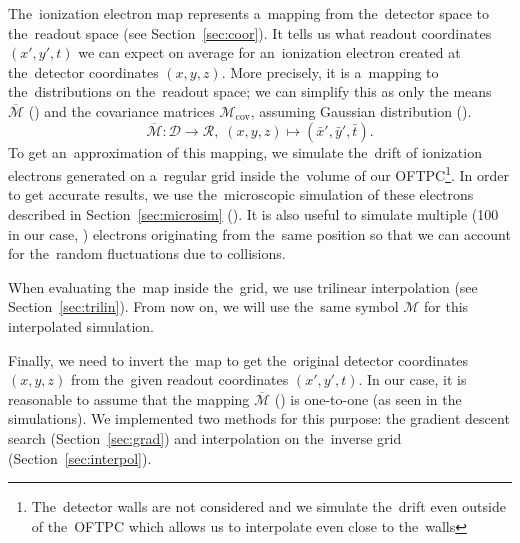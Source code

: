 		The~ionization electron map represents a~mapping from the~detector space to the~readout space (see Section~\ref{sec:coor}). It tells us what readout coordinates $(x',y',t)$ we can expect on average for an~ionization electron created at the~detector coordinates $(x,y,z)$. More precisely, it is a~mapping to the~distributions on the~readout space; we can simplify this as only the means $\overbar{\mathcal{M}}$ () and the covariance matrices $\mathcal{M}_\text{cov}$, assuming Gaussian distribution ().
			\begin{equation}
				\overbar{\mathcal{M}}: \mathcal{D} \longrightarrow \mathcal{R},\; (x,y,z) \longmapsto (\bar{x}',\bar{y}',\bar{t}).
			\end{equation}
		To get an~approximation of this mapping, we simulate the~drift of ionization electrons generated on a~regular grid inside the~volume of our \ac{OFTPC}\footnote{The~detector walls are not considered and we simulate the~drift even outside of the~\ac{OFTPC} which allows us to interpolate even close to the~walls}. In order to get accurate results, we use the~microscopic simulation of these electrons described in Section~\ref{sec:microsim} (). It is also useful to simulate multiple (100 in our case, ) electrons originating from the~same position so that we can account for the~random fluctuations due to collisions.
		
		When evaluating the~map inside the~grid, we use trilinear interpolation (see Section~\ref{sec:trilin}). From now on, we will use the~same symbol $\mathcal{M}$ for this interpolated simulation.
		
		Finally, we need to invert the~map to get the~original detector coordinates $(x,y,z)$ from the~given readout coordinates $(x',y',t)$. In our case, it is reasonable to assume that the mapping $\overbar{\mathcal{M}}$ () is one-to-one (as seen in the simulations). We implemented two methods for this purpose: the gradient descent search (Section~\ref{sec:grad}) and interpolation on the~inverse grid (Section~\ref{sec:interpol}).
		
